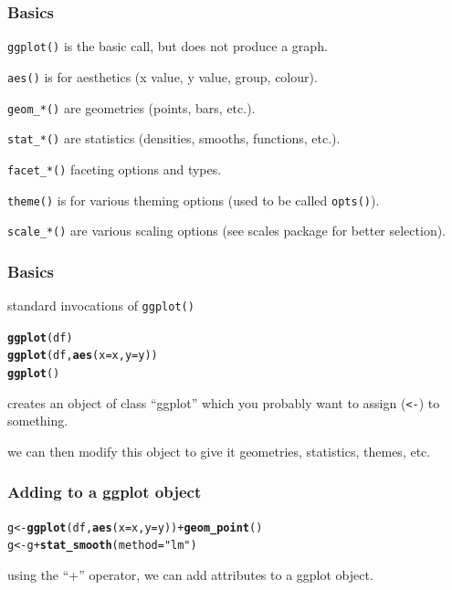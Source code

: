 \documentclass{beamer}\usepackage{graphicx, color}
\makeatletter
\newcommand{\hlfunctioncall}[1]{\textcolor[rgb]{0.501960784313725,0,0.329411764705882}{\textbf{#1}}}%
\newcommand{\hlstring}[1]{\textcolor[rgb]{0.6,0.6,1}{#1}}%
\newenvironment{kframe}{%
 \def\at@end@of@kframe{}%
 \ifinner\ifhmode%
  \def\at@end@of@kframe{\end{minipage}}%
  \begin{minipage}{\columnwidth}%
 \fi\fi%
 \def\FrameCommand##1{\hskip\@totalleftmargin \hskip-\fboxsep
 \colorbox{shadecolor}{##1}\hskip-\fboxsep
     \hskip-\linewidth \hskip-\@totalleftmargin \hskip\columnwidth}%
 \MakeFramed {\advance\hsize-\width
   \@totalleftmargin\z@ \linewidth\hsize
   \@setminipage}}%
 {\par\unskip\endMakeFramed%
 \at@end@of@kframe}
\newenvironment{knitrout}{}{} %
\makeatother
\begin{document}
\begin{frame}
  \frametitle{Basics}
  \texttt{ggplot()} is the basic call, but does not produce a graph.

  \texttt{aes()} is for aesthetics (x value, y value, group, colour).

  \texttt{geom\_*()} are geometries (points, bars, etc.).

  \texttt{stat\_*()} are statistics (densities, smooths, functions, etc.).

  \texttt{facet\_*()} faceting options and types.

  \texttt{theme()} is for various theming options (used to be called \texttt{opts()}).

  \texttt{scale\_*()} are various scaling options (see scales package for better selection).

\end{frame}

\begin{frame}[fragile]
  \frametitle{Basics}
  standard invocations of \texttt{ggplot()}

\begin{knitrout}
\color{fgcolor}\begin{kframe}
\begin{alltt}
\hlfunctioncall{ggplot}(df)
\hlfunctioncall{ggplot}(df, \hlfunctioncall{aes}(x = x, y = y))
\hlfunctioncall{ggplot}()
\end{alltt}
\end{kframe}
\end{knitrout}


  creates an object of class ``ggplot'' which you probably want to assign (\texttt{<-}) to something.

  we can then modify this object to give it geometries, statistics, themes, etc.

\end{frame}

\begin{frame}[fragile]
  \frametitle{Adding to a ggplot object}
\begin{knitrout}
\color{fgcolor}\begin{kframe}
\begin{alltt}
g <- \hlfunctioncall{ggplot}(df, \hlfunctioncall{aes}(x = x, y = y)) + \hlfunctioncall{geom_point}()
g <- g + \hlfunctioncall{stat_smooth}(method = \hlstring{"lm"})
\end{alltt}
\end{kframe}
\end{knitrout}


  using the ``+'' operator, we can add attributes to a ggplot object.

\end{frame}
\end{document}
